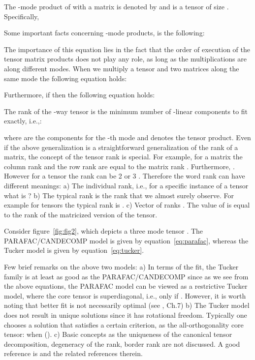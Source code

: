 The -mode product of  with a matrix  is denoted by 
and is a tensor of size .
Specifically,

Some important facts concerning -mode products, is the following: 



The importance of this equation lies in the fact that the order of execution
of the tensor matrix products does not play any role, as long as the multiplications
are along different modes. 
When we multiply a tensor and two matrices along the same mode the following equation holds:



Furthermore, if  then the following equation holds: 


The rank  of the -way tensor  is the minimum number of -linear components
to fit  exactly, i.e.,: 


where  are the  components for the -th mode and 
 denotes the tensor product. 
Even if the above generalization is a straightforward generalization of the rank of a matrix,
the concept of the tensor rank is special.  For example,  
for a matrix  the column rank  and the row rank 
are equal  to the matrix rank . Furthermore, . 
However for a tensor  the rank can be 2 or 3 \cite{120567}.
Therefore the word rank can have different meanings:
a) The individual rank, i.e., for a specific instance of a tensor what is ?
b) The typical rank is the rank that we almost surely observe. For example for 
tensors the typical rank is . c) Vector of ranks . The value of 
is equal to the rank of the matricized version  of the tensor. 

Consider figure~\ref{fig:fig2}, which depicts a three mode tensor . 
The PARAFAC/CANDECOMP model is given by equation~\ref{eq:parafac}, whereas the Tucker model is given by equation~\ref{eq:tucker}.





Few brief remarks on the above two models: 
a) In terms of the fit, the Tucker family is at least as good as the PARAFAC/CANDECOMP
since as we see from the above equations, the PARAFAC model can be viewed as a restrictive Tucker model, where the core tensor  
is superdiagonal, i.e.,  only if . 
However, it is worth noting that better fit is not necessarily optimal (see \cite{brobook}, Ch.7)
b) The Tucker model does not result in unique solutions since it has rotational freedom. 
Typically one chooses a solution that satisfies a certain criterion, as the all-orthogonality
core tensor:  when  (\cite{citeulike:4308452}). 
c) Basic concepts as the uniqueness of the canonical tensor decomposition, degeneracy of the rank, border rank are not discussed. A good reference is \cite{tamarasurvey}
and the related references therein. 

